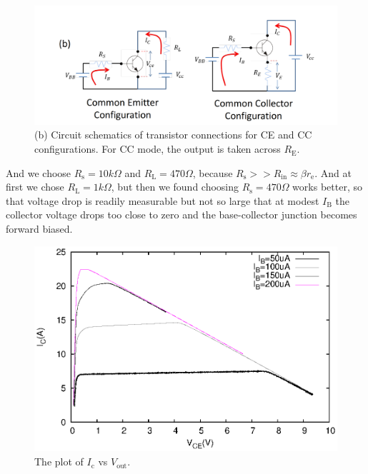\documentclass[11pt]{article}
\begin{document}
\begin{figure}[H]
 \begin{center}
  \includegraphics[width=\linewidth/1]{emitter}
  \caption{(b) Circuit schematics of 
transistor connections for CE and CC configurations. For
CC mode, the output is taken across $R_{\mathrm{E}}$.}
  \label{fig:emitter}
 \end{center}
\end{figure}

And we choose $R_{\mathrm{s}}=10k\Omega$ and $R_{\mathrm{L}}=470\Omega$, because $R_{\mathrm{s}}>>R_{\mathrm{in}} \approx \beta r_{\mathrm{e}}$. And at first we chose $R_{\mathrm{L}}=1k\Omega$, but then we found choosing $R_{\mathrm{s}}=470\Omega$ works better, so that voltage drop is readily measurable but not so large that at modest $I_{\mathrm{B}}$ the collector voltage drops too close to zero and the base-collector junction becomes forward biased.



\begin{figure}[H]
 \begin{center}
  \includegraphics[width=\linewidth/1]{IcVce}
  \caption{The plot of $I_{\mathrm{c}}$ vs $V_{\mathrm{out}}$.}
  \label{fig:IcVce}
 \end{center}
\end{figure}
\end{document}
